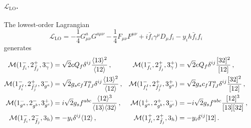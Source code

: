 \begin{subappendices}
\paragraph{\texorpdfstring{$\mathcal L_{\text{LO}}$}{L LO}.}
The lowest-order Lagrangian
\begin{equation}
    \mathcal L_{\text{LO}} = -\frac{1}{4}G_{\mu\nu}^a G^{a\mu\nu}-\frac{1}{4}F_{\mu\nu}F^{\mu\nu}+i\bar f_i \gamma^\mu D_\mu f_i - y_i h \bar f_i f_i
\end{equation}
generates
\begin{align}
    \mathcal M(1^-_{f_i},2^+_{\bar f_j},3^-_\gamma) &= \sqrt 2 e Q_f \delta^{ij} \frac{\langle 1 3 \rangle^2}{\langle 1 2 \rangle}\,, &
     \mathcal M(1^-_{f_i},2^+_{\bar f_j},3^+_\gamma) &= \sqrt 2 e Q_f \delta^{ij}\frac{\lbrack 3 2 \rbrack^2}{\lbrack 1 2 \rbrack}\,, \\
     \mathcal M(1^-_{f_i^I},2^+_{\bar f_j^J},3^-_{g^a}) &= \sqrt 2 g_s c_f T^a_{IJ}\delta^{ij} \frac{\langle 1 3 \rangle^2}{\langle 1 2 \rangle}\,, &
     \mathcal M(1^-_{f_i^I},2^+_{\bar f_j^J},3^+_{g^a}) &= \sqrt 2 g_s c_f T^a_{IJ} \delta^{ij}\frac{\lbrack 3 2 \rbrack^2}{\lbrack 1 2 \rbrack}\,, \\
     \mathcal M(1^-_{g^a},2^-_{g^b},3^+_{g^c}) &= i\sqrt 2 g_s f^{abc}\frac{\langle 1 2 \rangle^3}{\langle 1 3 \rangle\langle 3 2 \rangle}\,,  &
     \mathcal M(1^+_{g^a},2^+_{g^b},3^-_{g^c}) &=-i\sqrt 2 g_s f^{abc}\frac{\lbrack 1 2 \rbrack^3}{\lbrack 1 3 \rbrack\lbrack 3 2 \rbrack}\,,  \\
     \mathcal M(1^-_{f_i},2^-_{\bar f_j},3_h) &= - y_i\delta^{ij}\langle 1 2 \rangle\,, &
     \mathcal M(1^+_{f_i},2^+_{\bar f_j},3_h) &= - y_i \delta^{ij} \lbrack 1 2 \rbrack \,.
\end{align}


\end{subappendices}
